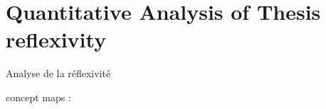 

\chapter{Quantitative Analysis of Thesis reflexivity}{Analyse de la réflexivité} %




\label{app:reflexivity} %









concept maps : \cite{novak2008theory}




